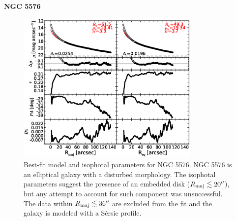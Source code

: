 \documentclass[preprint2]{emulateapj}
\newcommand{\fitfigurewidth}{0.8\textwidth}
\begin{document}
  \clearpage\newpage\noindent

  {\bf NGC 5576 \\}

  \begin{figure}[h]
  \begin{center}
  \includegraphics[width=\fitfigurewidth]{images/n5576_1Dfit.eps}
  \caption{Best-fit model and isophotal parameters for NGC 5576.
  NGC 5576 is an elliptical galaxy with a disturbed morphology. 
  The isophotal parameters suggest the presence of an embedded disk ($R_{\rm maj} \lesssim 20''$), 
  but any attempt to account for such component was unsuccessful. 
  The data within $R_{\rm maj} \lesssim 36''$ are excluded from the fit 
  and the galaxy is modeled with a S\'ersic profile.
  } 
  \end{center}
  \end{figure}
  
\end{document}

